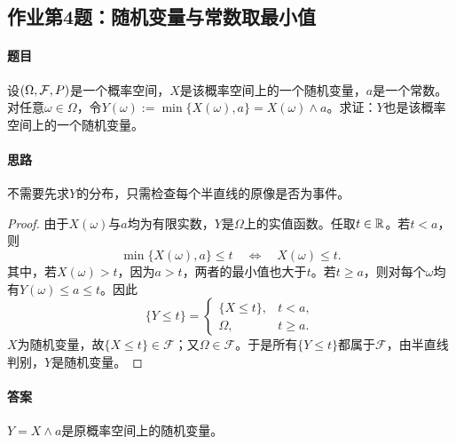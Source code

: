 \subsection{作业第4题：随机变量与常数取最小值}
\label{ex:w05-h4}
\paragraph{题目}
设$(\Omega,\mathcal F,\P)$是一个概率空间，$X$是该概率空间上的一个随机变量，$a$是一个常数。对任意$\omega\in\Omega$，令$Y(\omega):=\min\{X(\omega),a\}=X(\omega)\wedge a$。求证：$Y$也是该概率空间上的一个随机变量。
\paragraph{思路}不需要先求$Y$的分布，只需检查每个半直线的原像是否为事件。
\begin{proof}
由于$X(\omega)$与$a$均为有限实数，$Y$是$\Omega$上的实值函数。任取$t\in\R$。若$t<a$，则
\[
\min\{X(\omega),a\}\leq t\quad\Longleftrightarrow\quad X(\omega)\leq t.
\]
其中，若$X(\omega)>t$，因为$a>t$，两者的最小值也大于$t$。若$t\geq a$，则对每个$\omega$均有$Y(\omega)\leq a\leq t$。因此
\[
\{Y\leq t\}=
\begin{cases}
\{X\leq t\},&t<a,\\
\Omega,&t\geq a.
\end{cases}
\]
$X$为随机变量，故$\{X\leq t\}\in\mathcal F$；又$\Omega\in\mathcal F$。于是所有$\{Y\leq t\}$都属于$\mathcal F$，由半直线判别，$Y$是随机变量。
\end{proof}
\paragraph{答案}$Y=X\wedge a$是原概率空间上的随机变量。
